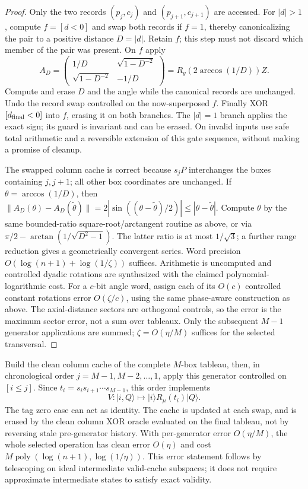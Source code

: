\documentclass[11pt]{article}
\theoremstyle{definition}
\newcommand{\ket}[1]{\lvert #1\rangle}
\newcommand{\norm}[1]{\lVert #1\rVert}
\newcommand{\poly}{\operatorname{poly}}
\DeclareMathOperator{\atan}{arctan}
\begin{document}
\begin{proof}
Only the two records $(p_j,c_j)$ and $(p_{j+1},c_{j+1})$ are accessed.
For $|d|>1$, compute $f=[d<0]$ and swap both records if $f=1$, thereby
canonicalizing the pair to a positive distance $D=|d|$. Retain $f$; this
step must not discard which member of the pair was present. On $f$ apply
\[
 A_D=\begin{pmatrix}1/D&\sqrt{1-D^{-2}}\\
             \sqrt{1-D^{-2}}&-1/D\end{pmatrix}
       =R_y(2\arccos(1/D))Z.
\]
Compute and erase $D$ and the angle while the canonical records are
unchanged. Undo the record swap controlled on the now-superposed $f$.
Finally XOR $[d_{\rm final}<0]$ into $f$, erasing it on both branches.
The $|d|=1$ branch applies the exact sign; its guard is invariant and can
be erased. On invalid inputs use safe total arithmetic and a reversible
extension of this gate sequence, without making a promise of cleanup.

The swapped column cache is correct because $s_jP$ interchanges the boxes
containing $j,j+1$; all other box coordinates are unchanged. If
$\theta=\arccos(1/D)$, then
$\norm{A_D(\theta)-A_D(\widetilde\theta)}
=2|\sin((\theta-\widetilde\theta)/2)|\le|\theta-\widetilde\theta|$.
Compute $\theta$ by the same bounded-ratio square-root/arctangent routine
as above, or via $\pi/2-\atan(1/\sqrt{D^2-1})$. The latter ratio is at
most $1/\sqrt3$; a further range reduction gives a geometrically
convergent series. Word precision $O(\log(n+1)+\log(1/\zeta))$ suffices.
Arithmetic is uncomputed and controlled dyadic rotations are synthesized
with the claimed polynomial-logarithmic cost. For a $c$-bit angle word,
assign each of its $O(c)$ controlled constant rotations error $O(\zeta/c)$,
using the same phase-aware construction as above. The axial-distance
sectors are orthogonal controls, so the error is the maximum sector error,
not a sum over tableaux. Only the subsequent $M-1$ generator applications
are summed; $\zeta=O(\eta/M)$ suffices for the selected transversal.
\end{proof}

Build the clean column cache of the complete $M$-box tableau, then, in
chronological order $j=M-1,M-2,\ldots,1$, apply this generator controlled
on $[i\le j]$. Since $t_i=s_i s_{i+1}\cdots s_{M-1}$, this order implements
\[
 V:\ket{i,Q}\longmapsto\ket i R_\mu(t_i)\ket Q.
\]
The tag zero case can act as identity. The cache is updated at each swap,
and is erased by the clean column XOR oracle evaluated on the final
tableau, not by reversing stale pre-generator history. With per-generator
error $O(\eta/M)$, the whole selected operation has clean error $O(\eta)$
and cost $M\poly(\log(n+1),\log(1/\eta))$. This error statement follows
by telescoping on ideal intermediate valid-cache subspaces; it does not
require approximate intermediate states to satisfy exact validity.
\end{document}
